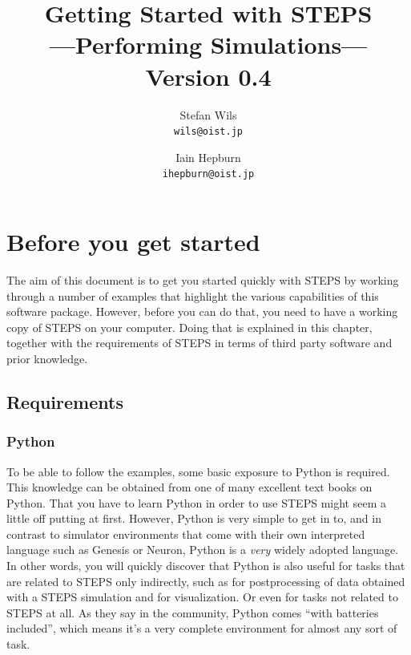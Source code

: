 \documentclass[a4paper,12pt]{book}
\newcommand{\stepsversion}[0]{0.4}
\begin{document}

\title{Getting Started with STEPS\\
---Performing Simulations---\\
Version \stepsversion}
\author{Stefan Wils\\
\texttt{wils@oist.jp} \and
Iain Hepburn\\
\texttt{ihepburn@oist.jp}}
\maketitle

\tableofcontents

\chapter{Before you get started}

The aim of this document is to get you started quickly with STEPS by working through a number of examples that highlight the various capabilities of this software package. However, before you can do that, you need to have a working copy of STEPS on your computer. Doing that is explained in this chapter, together with the requirements of STEPS in terms of third party software and prior knowledge.

\section{Requirements}

\subsection{Python}

To be able to follow the examples, some basic exposure to Python is required. This knowledge can be obtained from one of many excellent text books on Python. That you have to learn Python in order to use STEPS might seem a little off putting at first. However, Python is very simple to get in to, and in contrast to simulator environments that come with their own interpreted language such as Genesis \cite{Bower:BookOfGenesis:1998} or Neuron, Python is a \emph{very} widely adopted language. In other words, you will quickly discover that Python is also useful for tasks that are related to STEPS only indirectly, such as for postprocessing of data obtained with a STEPS simulation and for visualization. Or even for tasks not related to STEPS at all. As they say in the community, Python comes ``with batteries included'', which means it's a very complete environment for almost any sort of task.
\end{document}
